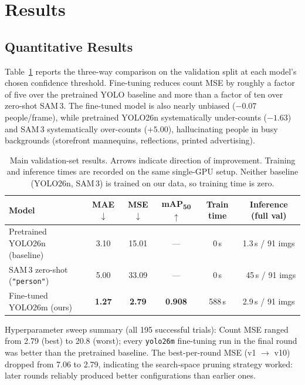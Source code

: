 \documentclass{article}
\begin{document}
\section{Results}
\subsection{Quantitative Results}
\label{sec:quant}
Table~\ref{tab:main_results} reports the three-way comparison on
the validation split at each model's chosen confidence threshold.
Fine-tuning reduces count MSE by roughly a factor of five over the
pretrained YOLO baseline and more than a factor of ten over
zero-shot SAM\,3. The fine-tuned model is also nearly unbiased
($-0.07$ people/frame), while pretrained YOLO26n systematically
under-counts ($-1.63$) and SAM\,3 systematically over-counts
($+5.00$), hallucinating people in busy backgrounds (storefront
mannequins, reflections, printed advertising).

\begin{table}[t]
    \centering
    \caption{Main validation-set results. Arrows indicate direction
    of improvement. Training and inference times are recorded on
    the same single-GPU setup. Neither baseline (YOLO26n, SAM\,3)
    is trained on our data, so training time is zero.}
    \label{tab:main_results}
    \begin{tabular}{lccccc}
        \toprule
        Model & MAE $\downarrow$ & MSE $\downarrow$ & mAP\textsubscript{50} $\uparrow$ & Train time & Inference (full val) \\
        \midrule
        Pretrained YOLO26n (baseline)        & 3.10 & 15.01 & --- & 0\,s   & 1.3\,s / 91 imgs \\
        SAM\,3 zero-shot (\texttt{"person"}) & 5.00 & 33.09 & --- & 0\,s   & ~45\,s / 91 imgs \\
        Fine-tuned YOLO26m (ours)            & \textbf{1.27} & \textbf{2.79} & \textbf{0.908} & 588\,s & 2.9\,s / 91 imgs \\
        \bottomrule
    \end{tabular}
\end{table}

Hyperparameter sweep summary (all 195 successful trials): Count
MSE ranged from 2.79 (best) to 20.8 (worst); every
\texttt{yolo26m} fine-tuning run in the final round was better
than the pretrained baseline. The best-per-round MSE (v1
$\to$ v10) dropped from 7.06 to 2.79, indicating the search-space
pruning strategy worked: later rounds reliably produced better
configurations than earlier ones.
\end{document}

